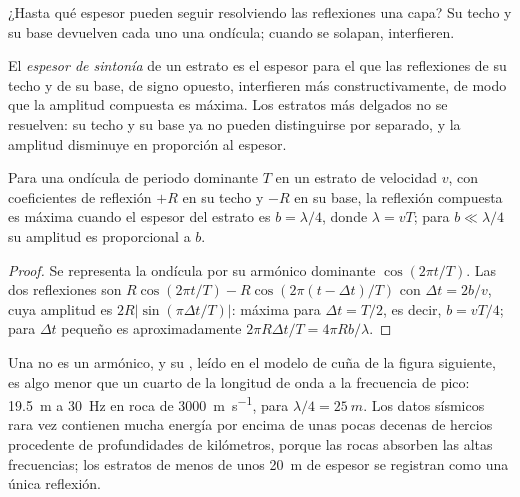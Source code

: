¿Hasta qué espesor pueden seguir resolviendo las reflexiones una capa? Su techo y su base
devuelven cada uno una ondícula; cuando se solapan, interfieren.

\begin{definition}\label{def:b3:exploration-seismology:resolution}
El \emph{espesor de sintonía} de un estrato es el
espesor para el que las reflexiones de su techo y de su base, de signo opuesto,
interfieren más constructivamente, de modo que la amplitud compuesta es máxima. Los estratos más delgados
no se resuelven: su techo y su base ya no pueden distinguirse por separado, y la
amplitud disminuye en proporción al espesor.
\end{definition}

\begin{proposition}\label{prop:b3:exploration-seismology:tuning}
Para una ondícula de periodo dominante $T$ en un estrato de velocidad $v$, con
coeficientes de reflexión $+R$ en su techo y $-R$ en su base, la reflexión
compuesta es máxima cuando el espesor del estrato es $b = \lambda/4$, donde
$\lambda = vT$; para $b \ll \lambda/4$ su amplitud es proporcional a $b$.
\end{proposition}

\begin{proof}
Se representa la ondícula por su armónico dominante $\cos(2\pi t/T)$. Las dos
reflexiones son $R\cos(2\pi t/T) - R\cos(2\pi(t - \Delta t)/T)$ con
$\Delta t = 2b/v$, cuya amplitud es $2R|\sin(\pi\Delta t/T)|$: máxima para
$\Delta t = T/2$, es decir, $b = vT/4$; para $\Delta t$ pequeño es aproximadamente
$2\pi R\Delta t/T = 4\pi Rb/\lambda$.
\end{proof}

Una  no es un armónico, y su , leído en el
modelo de cuña de la figura siguiente, es algo menor que un cuarto de la longitud
de onda a la frecuencia de pico: \qty{19.5}{m} a \qty{30}{Hz} en roca de
\qty{3000}{m.s^{-1}}, para $\lambda/4 = \qty{25}{m}$. Los datos sísmicos rara vez contienen
mucha energía por encima de unas pocas decenas de hercios procedente de profundidades de kilómetros, porque las
rocas absorben las altas frecuencias; los estratos de menos de unos \qty{20}{m} de espesor se
registran como una única reflexión.

